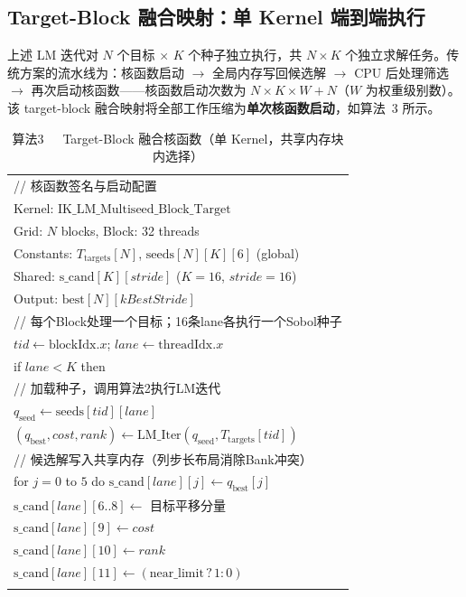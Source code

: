 \documentclass[twocolumn,a4paper,10pt]{ctexart}
\makeatletter
\newenvironment{algotable}[2]{%
  \begin{table}[htbp]
  \centering
  \caption{#2}
  \label{#1}
  \footnotesize\ttfamily
  \begin{tabular}{@{}p{\columnwidth}@{}}
  \toprule
}{%
  \\\bottomrule
  \end{tabular}
  \end{table}
}
\makeatother
\begin{document}
\subsection{Target-Block 融合映射：单 Kernel 端到端执行}

上述 LM 迭代对 $N$ 个目标 $\times$ $K$ 个种子独立执行，共 $N\times K$ 个独立求解任务。传统方案的流水线为：核函数启动 $\to$ 全局内存写回候选解 $\to$ CPU 后处理筛选 $\to$ 再次启动核函数——核函数启动次数为 $N\times K\times W+N$（$W$ 为权重级别数）。该 target-block 融合映射将全部工作压缩为\textbf{单次核函数启动}，如算法~3 所示。

\begin{algotable}{alg:kernel}{算法3~~~Target-Block 融合核函数（单 Kernel，共享内存块内选择）}
// 核函数签名与启动配置\\
Kernel: $\mathrm{IK\_LM\_Multiseed\_Block\_Target}$\\
Grid: $N$ blocks, Block: 32 threads\\
Constants: $T_{\mathrm{targets}}[N]$, $\mathrm{seeds}[N][K][6]$ (global)\\
Shared: $\mathrm{s\_cand}[K][\textit{stride}]$ ($K{=}16$, $\textit{stride}{=}16$)\\
Output: $\mathrm{best}[N][\textit{kBestStride}]$\\[2pt]
// 每个Block处理一个目标；16条lane各执行一个Sobol种子\\
\quad $\textit{tid}\leftarrow\mathrm{blockIdx}.x$; $\textit{lane}\leftarrow\mathrm{threadIdx}.x$\\
\quad if $\textit{lane}<K$ then\\
// 加载种子，调用算法2执行LM迭代\\
\qquad $q_{\mathrm{seed}}\leftarrow\mathrm{seeds}[\textit{tid}][\textit{lane}]$\\
\qquad $(q_{\mathrm{best}},\textit{cost},\textit{rank})\leftarrow\mathrm{LM\_Iter}(q_{\mathrm{seed}},T_{\mathrm{targets}}[\textit{tid}])$\\
// 候选解写入共享内存（列步长布局消除Bank冲突）\\
\qquad for $j=0$ to $5$ do $\mathrm{s\_cand}[\textit{lane}][j]\leftarrow q_{\mathrm{best}}[j]$\\
\qquad $\mathrm{s\_cand}[\textit{lane}][6..8]\leftarrow$ 目标平移分量\\
\qquad $\mathrm{s\_cand}[\textit{lane}][9]\leftarrow\textit{cost}$\\
\qquad $\mathrm{s\_cand}[\textit{lane}][10]\leftarrow\textit{rank}$\\
\qquad $\mathrm{s\_cand}[\textit{lane}][11]\leftarrow(\mathrm{near\_limit}\,?\,1:0)$\\

\end{algotable}
\end{document}
